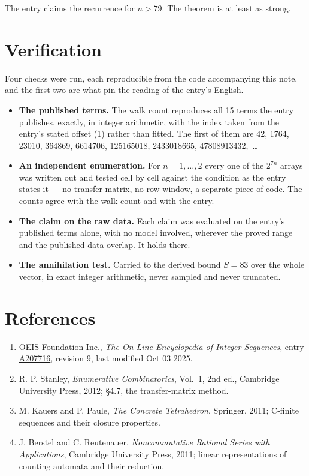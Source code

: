 \documentclass[11pt]{article}
\theoremstyle{definition}
\begin{document}
The entry claims the recurrence for $n > 79$. The theorem is at least as strong.

\section{Verification}

Four checks were run, each reproducible from the code accompanying this note, and the first two are what pin the reading of the entry's English.

\begin{itemize}

\item {\bfseries The published terms.} The walk count reproduces all 15 terms the entry publishes, exactly, in integer arithmetic, with the index taken from the entry's stated offset (1) rather than fitted. The first of them are 42, 1764, 23010, 364869, 6614706, 125165018, 2433018665, 47808913432,~\dots

\item {\bfseries An independent enumeration.} For $n = 1,\dots,2$ every one of the $2^{7n}$ arrays was written out and tested cell by cell against the condition as the entry states it --- no transfer matrix, no row window, a separate piece of code. The counts agree with the walk count and with the entry.

\item {\bfseries The claim on the raw data.} Each claim was evaluated on the entry's published terms alone, with no model involved, wherever the proved range and the published data overlap. It holds there.

\item {\bfseries The annihilation test.} Carried to the derived bound $S = 83$ over the whole vector, in exact integer arithmetic, never sampled and never truncated.

\end{itemize}

\section{References}

\begin{enumerate}

\item OEIS Foundation Inc., \emph{The On-Line Encyclopedia of Integer Sequences}, entry \href{https://oeis.org/A207716}{A207716}, revision 9, last modified Oct 03 2025.

\item R. P. Stanley, \emph{Enumerative Combinatorics}, Vol.~1, 2nd ed., Cambridge University Press, 2012; \S4.7, the transfer-matrix method.

\item M. Kauers and P. Paule, \emph{The Concrete Tetrahedron}, Springer, 2011; C-finite sequences and their closure properties.

\item J. Berstel and C. Reutenauer, \emph{Noncommutative Rational Series with Applications}, Cambridge University Press, 2011; linear representations of counting automata and their reduction.

\end{enumerate}
\end{document}

